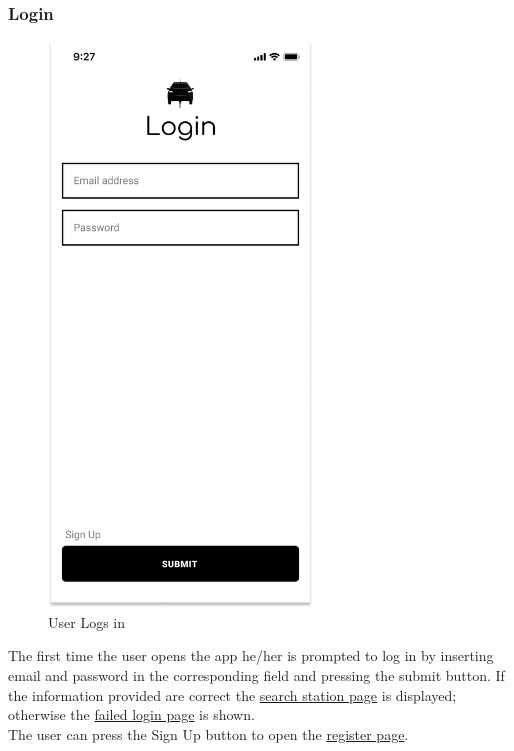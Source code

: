 \subsubsection{Login}
\begin{figure}[H]
    \centering
    \includegraphics[keepaspectratio, height=15cm]{AppInterface/Login.png}
    \caption{User Logs in}
    \label{fig:Login}
\end{figure}
The first time the user opens the app he/her is prompted to log in by inserting email and password in the corresponding field and pressing the submit button. If the information provided are correct the \hyperref[fig:Search]{search station page} is displayed; otherwise the \hyperref[fig:FailedLogin]{failed login page} is shown.\\
The user can press the Sign Up button to open the \hyperref[fig:Register]{register page}.
